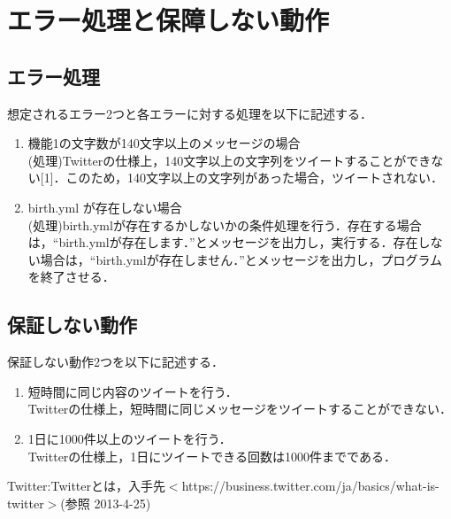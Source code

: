 \documentclass[fleqn, 14pt]{extarticlej}
\begin{document}
\section{エラー処理と保障しない動作}
\subsection{ エラー処理}
想定されるエラー2つと各エラーに対する処理を以下に記述する．
\begin{enumerate}
  \item 機能1の文字数が140文字以上のメッセージの場合\\
    (処理)Twitterの仕様上，140文字以上の文字列をツイートすることができない[1]．このため，140文字以上の文字列があった場合，ツイートされない．

  \item birth.yml が存在しない場合\\
    (処理)birth.ymlが存在するかしないかの条件処理を行う．存在する場合は，“birth.ymlが存在します．”とメッセージを出力し，実行する．存在しない場合は，“birth.ymlが存在しません．”とメッセージを出力し，プログラムを終了させる．
\end{enumerate}

\subsection{保証しない動作}
保証しない動作2つを以下に記述する．
\begin{enumerate}

 \item 短時間に同じ内容のツイートを行う．\\
   Twitterの仕様上，短時間に同じメッセージをツイートすることができない．

 \item 1日に1000件以上のツイートを行う．\\
   Twitterの仕様上，1日にツイートできる回数は1000件までである．

\end{enumerate}
\begin{thebibliography}{99}
   Twitter:Twitterとは，入手先$<$https://business.twitter.com/ja/basics/what-is-twitter$>$(参照 2013-4-25)
\end{thebibliography}
\end{document}
